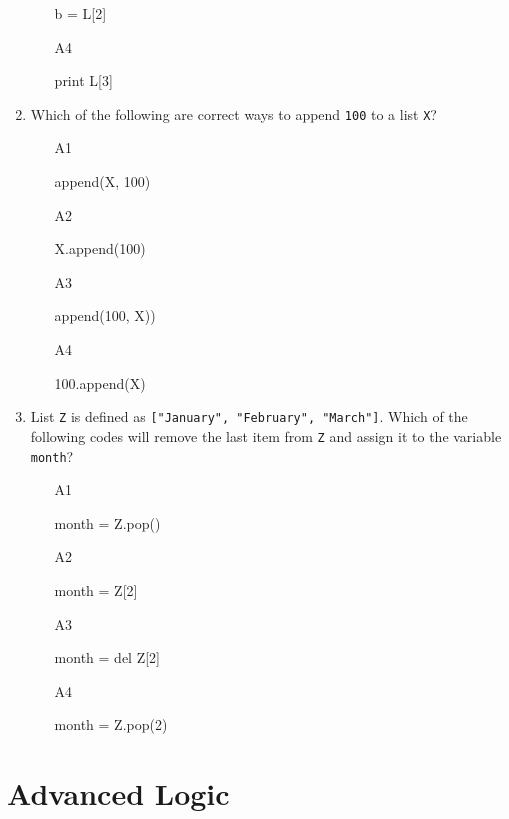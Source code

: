 \begin{enumerate}
\begin{enumerate}
\begin{bluecode}
b = L[2]
\end{bluecode}
\item[A4] 
\begin{bluecode}
print L[3]
\end{bluecode}
\end{enumerate}
\item Which of the following are correct ways to append {\tt 100} to a list {\tt X}?
\begin{enumerate}
\item[A1] 
\begin{bluecode}
append(X, 100)
\end{bluecode}
\item[A2] 
\begin{bluecode}
X.append(100)
\end{bluecode}
\item[A3] 
\begin{bluecode}
append(100, X))
\end{bluecode}
\item[A4] 
\begin{bluecode}
100.append(X)
\end{bluecode}
\end{enumerate}
\item List {\tt Z} is defined as {\tt ["January", "February", "March"]}.
Which of the following codes will remove the last item from {\tt Z} 
and assign it to the variable {\tt month}?
\begin{enumerate}
\item[A1] 
\begin{bluecode}
month = Z.pop()
\end{bluecode}
\item[A2] 
\begin{bluecode}
month = Z[2]
\end{bluecode}
\item[A3] 
\begin{bluecode}
month = del Z[2]
\end{bluecode}
\item[A4] 
\begin{bluecode}
month = Z.pop(2)
\end{bluecode}
\end{enumerate}
\end{enumerate}


\section{Advanced Logic}

